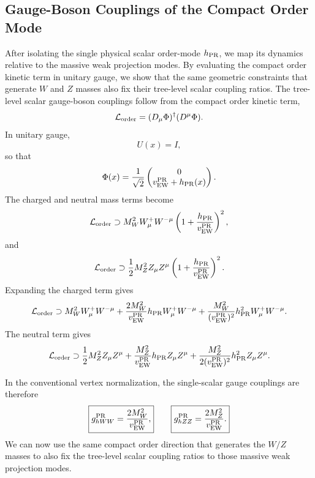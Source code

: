 \documentclass[11pt]{article}
\begin{document}
\subsection{Gauge-Boson Couplings of the Compact Order Mode}
\label{sec:pr2_order_mode_gauge_boson_couplings}
After isolating the single physical scalar order-mode $h_{\rm PR}$, we map its dynamics relative to the massive weak projection modes. By evaluating the compact order kinetic term in unitary gauge, we show that the same geometric constraints that generate $W$ and $Z$ masses also fix their tree-level scalar coupling ratios. The tree-level scalar gauge-boson couplings follow from the compact order kinetic term,
\begin{equation}
\mathcal L_{\rm order}
=
(D_\mu\Phi)^\dagger(D^\mu\Phi).
\end{equation}
In unitary gauge,
\begin{equation}
U(x)=I,
\end{equation}
so that
\begin{equation}
\Phi(x)
=
\frac{1}{\sqrt2}
\begin{pmatrix}
0\\
v_{\rm EW}^{\rm PR}+h_{\rm PR}(x)
\end{pmatrix}.
\end{equation}
The charged and neutral mass terms become
\begin{equation}
\mathcal L_{\rm order}
\supset
M_W^2
W_\mu^+W^{-\mu}
\left(
1+\frac{h_{\rm PR}}{v_{\rm EW}^{\rm PR}}
\right)^2,
\end{equation}
and
\begin{equation}
\mathcal L_{\rm order}
\supset
\frac12
M_Z^2
Z_\mu Z^\mu
\left(
1+\frac{h_{\rm PR}}{v_{\rm EW}^{\rm PR}}
\right)^2.
\end{equation}
Expanding the charged term gives
\begin{equation}
\mathcal L_{\rm order}
\supset
M_W^2W_\mu^+W^{-\mu}
+
\frac{2M_W^2}{v_{\rm EW}^{\rm PR}}
h_{\rm PR}W_\mu^+W^{-\mu}
+
\frac{M_W^2}{(v_{\rm EW}^{\rm PR})^2}
h_{\rm PR}^2W_\mu^+W^{-\mu}.
\end{equation}
The neutral term gives
\begin{equation}
\mathcal L_{\rm order}
\supset
\frac12M_Z^2Z_\mu Z^\mu
+
\frac{M_Z^2}{v_{\rm EW}^{\rm PR}}
h_{\rm PR}Z_\mu Z^\mu
+
\frac{M_Z^2}{2(v_{\rm EW}^{\rm PR})^2}
h_{\rm PR}^2Z_\mu Z^\mu.
\end{equation}

In the conventional vertex normalization, the single-scalar gauge couplings are therefore
\begin{equation}
\boxed{
g_{hWW}^{\rm PR}
=
\frac{2M_W^2}{v_{\rm EW}^{\rm PR}},
}
\qquad
\boxed{
g_{hZZ}^{\rm PR}
=
\frac{2M_Z^2}{v_{\rm EW}^{\rm PR}}.
}
\end{equation}
We can now use the same compact order direction that generates the \(W/Z\) masses to also fix the tree-level scalar coupling ratios to those massive weak projection modes.
\end{document}
